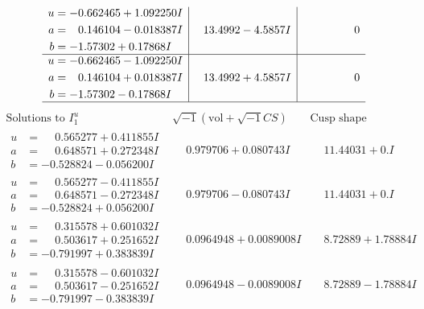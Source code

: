 \documentclass[1p]{elsarticle_modified}
\theoremstyle{definition}
\newcommand{\I}{\sqrt{-1}}
\begin{document}
$$\begin{array}{c|c|c}
\begin{aligned}
u &= -0.662465 + 1.092250 I \\
a &= \phantom{-}0.146104 - 0.018387 I \\
b &= -1.57302 + 0.17868 I\end{aligned}
 & \phantom{-}13.4992 - 4.5857 I & \phantom{-0.000000 } 0 \\ \hline\begin{aligned}
u &= -0.662465 - 1.092250 I \\
a &= \phantom{-}0.146104 + 0.018387 I \\
b &= -1.57302 - 0.17868 I\end{aligned}
 & \phantom{-}13.4992 + 4.5857 I & \phantom{-0.000000 } 0\\
 \hline 
 \end{array}$$\newpage$$\begin{array}{c|c|c}  
\text{Solutions to }I^u_{1}& \I (\text{vol} + \sqrt{-1}CS) & \text{Cusp shape}\\
 \hline 
\begin{aligned}
u &= \phantom{-}0.565277 + 0.411855 I \\
a &= \phantom{-}0.648571 + 0.272348 I \\
b &= -0.528824 - 0.056200 I\end{aligned}
 & \phantom{-}0.979706 + 0.080743 I & \phantom{-}11.44031 + 0. I\phantom{ +0.000000I} \\ \hline\begin{aligned}
u &= \phantom{-}0.565277 - 0.411855 I \\
a &= \phantom{-}0.648571 - 0.272348 I \\
b &= -0.528824 + 0.056200 I\end{aligned}
 & \phantom{-}0.979706 - 0.080743 I & \phantom{-}11.44031 + 0. I\phantom{ +0.000000I} \\ \hline\begin{aligned}
u &= \phantom{-}0.315578 + 0.601032 I \\
a &= \phantom{-}0.503617 + 0.251652 I \\
b &= -0.791997 + 0.383839 I\end{aligned}
 & \phantom{-}0.0964948 + 0.0089008 I & \phantom{-}8.72889 + 1.78884 I \\ \hline\begin{aligned}
u &= \phantom{-}0.315578 - 0.601032 I \\
a &= \phantom{-}0.503617 - 0.251652 I \\
b &= -0.791997 - 0.383839 I\end{aligned}
 & \phantom{-}0.0964948 - 0.0089008 I & \phantom{-}8.72889 - 1.78884 I \\ \hline\begin{aligned}

\end{aligned}
\end{array}$$
\end{document}
